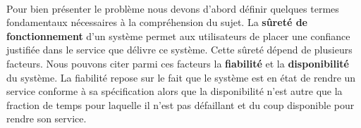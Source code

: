 \documentclass[a4paper, 10pt]{report}
\begin{document}
\paragraph*{}
Pour bien présenter le problème nous devons d'abord définir quelques termes fondamentaux nécessaires à la 
compréhension du sujet.\newline
La \textbf{sûreté de fonctionnement} d'un système permet aux utilisateurs de placer une confiance 
justifiée dans le service que délivre ce système. Cette sûreté dépend de plusieurs facteurs. Nous pouvons 
citer parmi ces facteurs la \textbf{fiabilité} et la \textbf{disponibilité} du système. La fiabilité 
repose sur le fait que le système est en état de rendre un service conforme à sa spécification alors que 
la disponibilité n'est autre que la fraction de temps pour laquelle il n'est pas défaillant et du coup 
disponible pour rendre son service.
\end{document}
